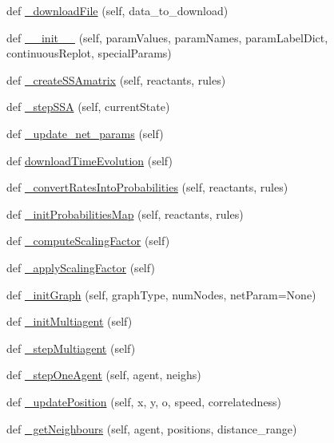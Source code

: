 \begin{DoxyCompactItemize}
def \hyperlink{namespace_mu_mo_t_a4510fc6671dc3ab76027eda6cf578cfb}{\+\_\+download\+File} (self, data\+\_\+to\+\_\+download)
\item 
def \hyperlink{namespace_mu_mo_t_a203e76c007a565312c5715712851aadb}{\+\_\+\+\_\+init\+\_\+\+\_\+} (self, param\+Values, param\+Names, param\+Label\+Dict, continuous\+Replot, special\+Params)
\item 
def \hyperlink{namespace_mu_mo_t_ac14420f0d9209fc58dceb6e7742b8182}{\+\_\+create\+S\+S\+Amatrix} (self, reactants, rules)
\item 
def \hyperlink{namespace_mu_mo_t_af42479dc0e96110b83d9015631f02e9c}{\+\_\+step\+S\+SA} (self, current\+State)
\item 
def \hyperlink{namespace_mu_mo_t_a9a28bd5f29f28408370f4385c41fb045}{\+\_\+update\+\_\+net\+\_\+params} (self)
\item 
def \hyperlink{namespace_mu_mo_t_a767fc349799c43e81b8b7c79b9822d03}{download\+Time\+Evolution} (self)
\item 
def \hyperlink{namespace_mu_mo_t_ac1e8f80b5061cf666d889a48d46f83ff}{\+\_\+convert\+Rates\+Into\+Probabilities} (self, reactants, rules)
\item 
def \hyperlink{namespace_mu_mo_t_a3c7604d067731ffa76cf57c49b5e855e}{\+\_\+init\+Probabilities\+Map} (self, reactants, rules)
\item 
def \hyperlink{namespace_mu_mo_t_a762b2b53a71dbe1fee62f0498ce9cd14}{\+\_\+compute\+Scaling\+Factor} (self)
\item 
def \hyperlink{namespace_mu_mo_t_abbce630249f9f7985fe5fb4a46ddbe60}{\+\_\+apply\+Scaling\+Factor} (self)
\item 
def \hyperlink{namespace_mu_mo_t_aa2e74612dbe60bbf3405d1b814aa1596}{\+\_\+init\+Graph} (self, graph\+Type, num\+Nodes, net\+Param=None)
\item 
def \hyperlink{namespace_mu_mo_t_a5b0e59223eace5f42e29d56989db7f6c}{\+\_\+init\+Multiagent} (self)
\item 
def \hyperlink{namespace_mu_mo_t_a07410c9e089705e695091a2277184f0c}{\+\_\+step\+Multiagent} (self)
\item 
def \hyperlink{namespace_mu_mo_t_aee57d4dc31ddc1a90dea8f3405deb144}{\+\_\+step\+One\+Agent} (self, agent, neighs)
\item 
def \hyperlink{namespace_mu_mo_t_abd85de494ba030d07854207487bfdfca}{\+\_\+update\+Position} (self, x, y, o, speed, correlatedness)
\item 
def \hyperlink{namespace_mu_mo_t_abedf54d8c23705e6c9bf2ed5bdda0559}{\+\_\+get\+Neighbours} (self, agent, positions, distance\+\_\+range)

\end{DoxyCompactItemize}

